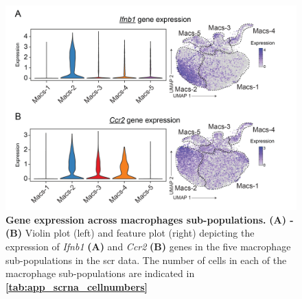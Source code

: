 \begin{figure}[H]
    \centering
    \includegraphics[width=12cm]{Appendix2/Fig/F2-A7-01.png}
    \caption[Gene expression across macrophages sub-populations]{\textbf{Gene expression across macrophages sub-populations.} \textbf{(A) - (B)} Violin plot (left) and feature plot (right) depicting the expression of \textit{Ifnb1} \textbf{(A)} and \textit{Ccr2} \textbf{(B)} genes in the five macrophage sub-populations in the \gls{scr} data. The number of cells in each of the macrophage sub-populations are indicated in \textbf{\autoref{tab:app_scrna_cellnumbers}} }
    \label{fig:app_scrna_macrophages_macs2_genes}
\end{figure}


\vspace{-22pt}


